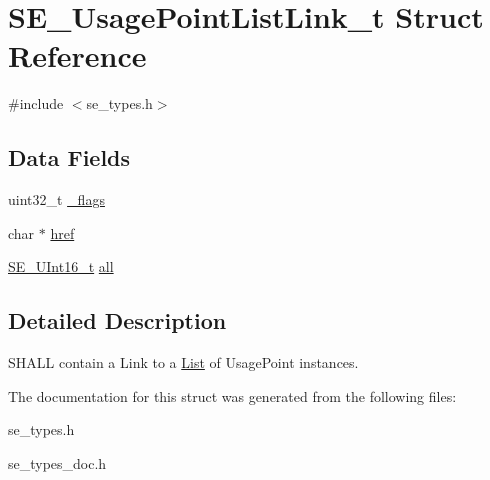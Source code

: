 \hypertarget{structSE__UsagePointListLink__t}{}\section{S\+E\+\_\+\+Usage\+Point\+List\+Link\+\_\+t Struct Reference}
\label{structSE__UsagePointListLink__t}


{\ttfamily \#include $<$se\+\_\+types.\+h$>$}

\subsection*{Data Fields}
\begin{DoxyCompactItemize}
\item 
uint32\+\_\+t \hyperlink{group__UsagePointListLink_gac8530fb930140ba77346df8dbd8c7f34}{\+\_\+flags}
\item 
char $\ast$ \hyperlink{group__UsagePointListLink_gad24ca03d23c037649b06258caa10524e}{href}
\item 
\hyperlink{group__UInt16_gac68d541f189538bfd30cfaa712d20d29}{S\+E\+\_\+\+U\+Int16\+\_\+t} \hyperlink{group__UsagePointListLink_ga8d1a435546d34b5044cd257654412458}{all}
\end{DoxyCompactItemize}


\subsection{Detailed Description}
S\+H\+A\+LL contain a Link to a \hyperlink{structList}{List} of Usage\+Point instances. 

The documentation for this struct was generated from the following files\+:\begin{DoxyCompactItemize}
\item 
se\+\_\+types.\+h\item 
se\+\_\+types\+\_\+doc.\+h\end{DoxyCompactItemize}
